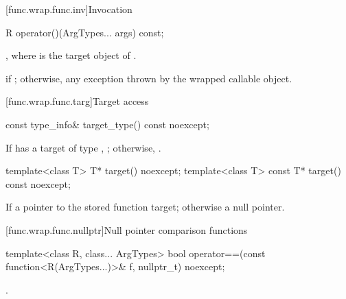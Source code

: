 [func.wrap.func.inv]{Invocation}

%
%
\begin{itemdecl}
R operator()(ArgTypes... args) const;
\end{itemdecl}

\begin{itemdescr}
\pnum
\returns
{},
where  is the target object of .

\pnum
\throws
{} if ; otherwise, any
exception thrown by the wrapped callable object.
\end{itemdescr}

[func.wrap.func.targ]{Target access}

%
\begin{itemdecl}
const type_info& target_type() const noexcept;
\end{itemdecl}

\begin{itemdescr}
\pnum
\returns
If  has a target of type ,
  ; otherwise, .
\end{itemdescr}

%
\begin{itemdecl}
template<class T>       T* target() noexcept;
template<class T> const T* target() const noexcept;
\end{itemdecl}

\begin{itemdescr}
\pnum
\returns
If 
a pointer to the stored function target; otherwise a null pointer.
\end{itemdescr}

[func.wrap.func.nullptr]{Null pointer comparison functions}

%
\begin{itemdecl}
template<class R, class... ArgTypes>
  bool operator==(const function<R(ArgTypes...)>& f, nullptr_t) noexcept;
\end{itemdecl}

\begin{itemdescr}
\pnum
\returns
{}.
\end{itemdescr}

